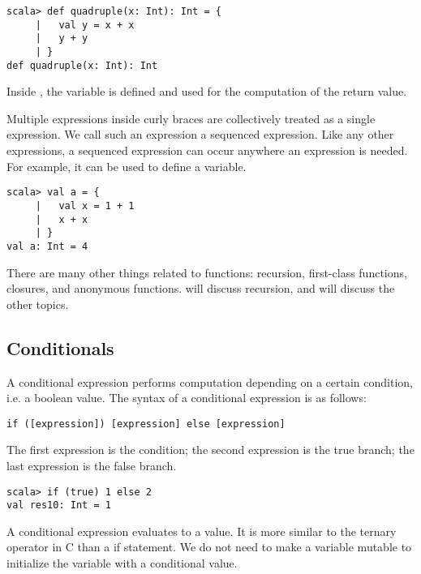 \begin{verbatim}
scala> def quadruple(x: Int): Int = {
     |   val y = x + x
     |   y + y
     | }
def quadruple(x: Int): Int
\end{verbatim}

Inside , the variable  is defined and used for the
computation of
the return value.

Multiple expressions inside curly braces are collectively treated as a single
expression. We call such an expression a sequenced expression. Like any other
expressions, a sequenced expression can occur anywhere an expression is needed.
For example, it can be used to define a variable.

\begin{verbatim}
scala> val a = {
     |   val x = 1 + 1
     |   x + x
     | }
val a: Int = 4
\end{verbatim}

There are many other things related to functions: recursion, first-class
functions, closures, and anonymous functions.  will
discuss recursion, and  will discuss the other topics.

\subsection{Conditionals}

A conditional expression performs computation depending on a certain
condition, i.e. a boolean value. The syntax of a conditional expression is as
follows:

\begin{verbatim}
if ([expression]) [expression] else [expression]
\end{verbatim}

The first expression is the condition; the second expression is the true branch;
the last expression is the false branch.

\begin{verbatim}
scala> if (true) 1 else 2
val res10: Int = 1
\end{verbatim}

A conditional expression evaluates to a value. It is more similar to the ternary
operator  in C than a if statement.
We do not need to make a variable
mutable to initialize the variable with a conditional value.

